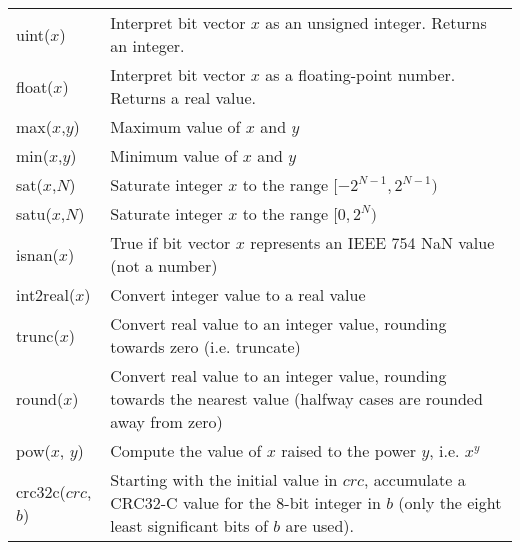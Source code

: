 \begin{tabular}{lp{340pt}}
uint($x$) & Interpret bit vector $x$ as an unsigned integer. Returns an
            integer. \\
float($x$) & Interpret bit vector $x$ as a floating-point number. Returns a real
             value. \\
max($x$,$y$) & Maximum value of $x$ and $y$ \\
min($x$,$y$) & Minimum value of $x$ and $y$ \\
sat($x$,$N$) & Saturate integer $x$ to the range $[-2^{N-1},2^{N-1})$ \\
satu($x$,$N$) & Saturate integer $x$ to the range $[0,2^{N})$ \\
isnan($x$) & True if bit vector $x$ represents an IEEE 754 NaN value (not a
             number) \\
int2real($x$) & Convert integer value to a real value \\
trunc($x$) & Convert real value to an integer value, rounding towards zero (i.e.
             truncate) \\
round($x$) & Convert real value to an integer value, rounding towards the
             nearest value (halfway cases are rounded away from zero) \\
pow($x$, $y$) & Compute the value of $x$ raised to the power $y$, i.e. $x^{y}$ \\
crc32c($crc$, $b$) & Starting with the initial value in $crc$, accumulate a CRC32-C
                     value for the 8-bit integer in $b$ (only the eight least
                     significant bits of $b$ are used).
\end{tabular}

\clearpage


